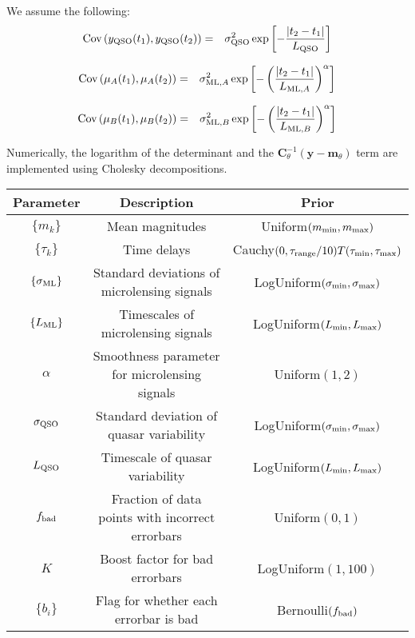 \documentclass[a4paper, 10pt]{article}
\newcommand{\yy}{\mathbf{y}}
\newcommand{\mm}{\mathbf{m}_\theta}
\newcommand{\CC}{\mathbf{C}_\theta}
\begin{document}
We assume the following:
\begin{eqnarray}
\textnormal{Cov}\left(y_{\rm QSO}(t_1), y_{\rm QSO}(t_2)\right)
&=& \sigma_{\rm QSO}^2\exp\left[-\frac{\left|t_2 - t_1\right|}{L_{\rm QSO}}\right]
\end{eqnarray}

\begin{eqnarray}
\textnormal{Cov}\left(\mu_A(t_1), \mu_A(t_2)\right)
&=& \sigma_{{\rm ML}, A}^2\exp\left[-\left(\frac{\left|t_2 - t_1\right|}{L_{{\rm ML}, A}}\right)^\alpha\right]
\end{eqnarray}

\begin{eqnarray}
\textnormal{Cov}\left(\mu_B(t_1), \mu_B(t_2)\right)
&=& \sigma_{{\rm ML}, B}^2\exp\left[-\left(\frac{\left|t_2 - t_1\right|}{L_{{\rm ML}, B}}\right)^\alpha\right]
\end{eqnarray}

Numerically, the logarithm of the determinant and the
$\CC^{-1}\left(\yy - \mm\right)$ term are implemented using
Cholesky decompositions.

\begin{table}[h!]
\begin{center}
\begin{tabular}{|c|c|c|}
\hline
Parameter & Description & Prior\\
\hline
$\{m_k\}$ & Mean magnitudes & Uniform$(m_{\rm min}, m_{\rm max})$\\
$\{\tau_k\}$ & Time delays & Cauchy$(0, \tau_{\rm range}/10)T(\tau_{\rm min}, \tau_{\rm max})$\\
$\{\sigma_{\rm ML}\}$ & Standard deviations of microlensing signals & LogUniform$(\sigma_{\rm min}, \sigma_{\rm max})$\\
$\{L_{\rm ML}\}$ & Timescales of microlensing signals & LogUniform$(L_{\rm min}, L_{\rm max})$\\
$\alpha$ & Smoothness parameter for microlensing signals & Uniform$(1,2)$\\
$\sigma_{\rm QSO}$ & Standard deviation of quasar variability & LogUniform$(\sigma_{\rm min}, \sigma_{\rm max})$\\
$L_{\rm QSO}$ & Timescale of quasar variability & LogUniform$(L_{\rm min}, L_{\rm max})$\\
$f_{\rm bad}$ & Fraction of data points with incorrect errorbars & Uniform$(0,1)$\\
$K$ & Boost factor for bad errorbars & LogUniform$(1, 100)$\\
$\{b_i\}$ & Flag for whether each errorbar is bad & Bernoulli$(f_{\rm bad})$\\
\hline
\end{tabular}
\end{center}
\end{table}
\end{document}
